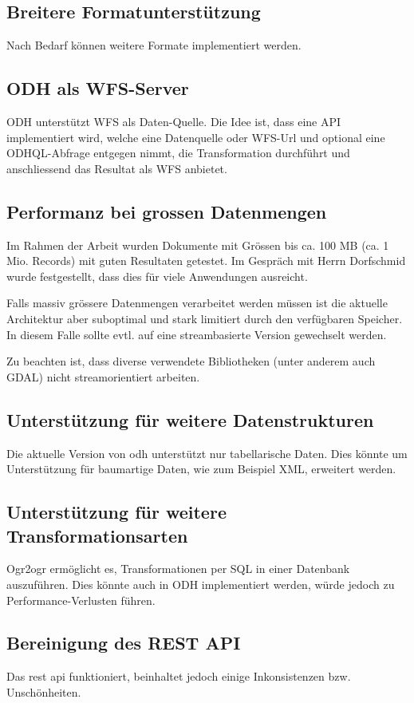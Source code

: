 \subsection{Breitere Formatunterstützung}
Nach Bedarf können weitere Formate implementiert werden.

\subsection{ODH als WFS-Server}
ODH unterstützt WFS als Daten-Quelle. Die Idee ist, dass eine API implementiert wird, welche eine Datenquelle oder WFS-Url und optional eine ODHQL-Abfrage entgegen nimmt, die Transformation durchführt und anschliessend das Resultat als WFS anbietet.

\subsection{Performanz bei grossen Datenmengen}
Im Rahmen der Arbeit wurden Dokumente mit Grössen bis ca. 100 MB (ca. 1 Mio. Records) mit guten Resultaten getestet. Im Gespräch mit Herrn Dorfschmid wurde festgestellt, dass dies für viele Anwendungen ausreicht.

Falls massiv grössere Datenmengen verarbeitet werden müssen ist die aktuelle Architektur aber suboptimal und stark limitiert durch den verfügbaren Speicher. In diesem Falle sollte evtl. auf eine streambasierte Version gewechselt werden.

Zu beachten ist, dass diverse verwendete Bibliotheken (unter anderem auch GDAL) nicht streamorientiert arbeiten.

\subsection{Unterstützung für weitere Datenstrukturen}
Die aktuelle Version von \acs{odh} unterstützt nur tabellarische Daten. Dies könnte um Unterstützung für baumartige Daten, wie zum Beispiel XML, erweitert werden. 

\subsection{Unterstützung für weitere Transformationsarten}
Ogr2ogr ermöglicht es, Transformationen per SQL in einer Datenbank auszuführen. Dies könnte auch in ODH implementiert werden, würde jedoch zu Performance-Verlusten führen.

\subsection{Bereinigung des REST API}
Das \gls{rest} \acs{api} funktioniert, beinhaltet jedoch einige Inkonsistenzen bzw. Unschönheiten. 

